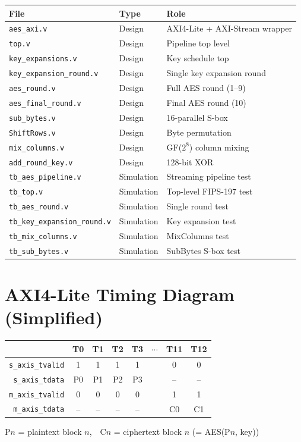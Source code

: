 \documentclass[12pt,a4paper]{article}
\begin{document}
\begin{table}[H]
\centering
\begin{tabular}{@{}lll@{}}
\toprule
\textbf{File} & \textbf{Type} & \textbf{Role}\\
\midrule
\texttt{aes\_axi.v}             & Design & AXI4-Lite + AXI-Stream wrapper\\
\texttt{top.v}                  & Design & Pipeline top level\\
\texttt{key\_expansions.v}      & Design & Key schedule top\\
\texttt{key\_expansion\_round.v}& Design & Single key expansion round\\
\texttt{aes\_round.v}           & Design & Full AES round (1--9)\\
\texttt{aes\_final\_round.v}    & Design & Final AES round (10)\\
\texttt{sub\_bytes.v}           & Design & 16-parallel S-box\\
\texttt{ShiftRows.v}            & Design & Byte permutation\\
\texttt{mix\_columns.v}         & Design & GF($2^8$) column mixing\\
\texttt{add\_round\_key.v}      & Design & 128-bit XOR\\
\midrule
\texttt{tb\_aes\_pipeline.v}    & Simulation & Streaming pipeline test\\
\texttt{tb\_top.v}              & Simulation & Top-level FIPS-197 test\\
\texttt{tb\_aes\_round.v}       & Simulation & Single round test\\
\texttt{tb\_key\_expansion\_round.v} & Simulation & Key expansion test\\
\texttt{tb\_mix\_columns.v}     & Simulation & MixColumns test\\
\texttt{tb\_sub\_bytes.v}       & Simulation & SubBytes S-box test\\
\bottomrule
\end{tabular}
\end{table}

\section{AXI4-Lite Timing Diagram (Simplified)}

\begin{center}
\small
\begin{tabular}{r|ccccccc}
 & \textbf{T0} & \textbf{T1} & \textbf{T2} & \textbf{T3} & \textbf{$\cdots$} & \textbf{T11} & \textbf{T12}\\
\hline
\texttt{s\_axis\_tvalid} & 1 & 1 & 1 & 1 & & 0 & 0\\
\texttt{s\_axis\_tdata}  & P0& P1& P2& P3& & -- & --\\
\texttt{m\_axis\_tvalid} & 0 & 0 & 0 & 0 & & 1 & 1\\
\texttt{m\_axis\_tdata}  & --& --& --& --& & C0& C1\\
\end{tabular}
\end{center}

P$n$ = plaintext block $n$,\ \ C$n$ = ciphertext block $n$ (= AES(P$n$, key))
\end{document}
